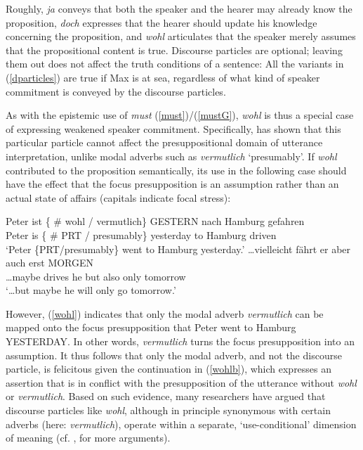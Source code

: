 \documentclass[11pt]{article}
\newcommand{\gcs}[1]{\textcolor{blue}{[gcs: #1]}}
\begin{document}
Roughly, \emph{ja} conveys that both the speaker and the hearer may already know the proposition, \emph{doch} expresses that the hearer should update his knowledge concerning the proposition, and \emph{wohl} articulates that the speaker merely assumes that the propositional content is true. Discourse particles are optional; leaving them out does not affect the truth conditions of a sentence: All the variants in (\ref{dparticles}) are true if Max is at sea, regardless of what kind of speaker commitment is conveyed by the discourse particles.


As with the epistemic use of \emph{must} (\ref{must})/(\ref{mustG}), \emph{wohl} is thus a special case of expressing weakened speaker commitment. Specifically, \cite{Zimmermann2004, Zimmermann2008} has shown that this particular particle cannot affect the presuppositional domain of utterance interpretation, unlike modal adverbs such as \emph{vermutlich} `presumably'. If \emph{wohl} contributed to the proposition semantically, its use in the following case should have the effect that the focus presupposition is an assumption rather than an actual state of affairs (capitals indicate focal stress):

\begin{exe}
\ex \label{wohl}
\begin{xlist}
\ex \gll Peter	ist	\{ \#	wohl  /	vermutlich\}	GESTERN			nach	 Hamburg	 gefahren	\\
		Peter	is		\{ \#	PRT  /   presumably\}	yesterday 		to	 Hamburg	 driven	\\	
\glt `Peter \{PRT/presumably\} went to Hamburg yesterday.'
\ex \label{wohlb} \gll \ldots vielleicht fährt er aber	auch erst MORGEN\\
\ldots maybe drives he but also only tomorrow\\
\glt `\ldots but maybe he will only go tomorrow.' 
\end{xlist}
\end{exe}
	
	
However, (\ref{wohl}) indicates that only the modal adverb \emph{vermutlich} can be mapped onto the focus presupposition that Peter went to Hamburg YESTERDAY. In other words, \emph{vermutlich} turns the focus presupposition into an assumption. It thus follows that only the modal adverb, and not the discourse particle, is felicitous given the continuation in (\ref{wohlb}), which expresses an assertion that is in conflict with the presupposition of the utterance without \emph{wohl} or \emph{vermutlich}. Based on such evidence, many researchers have argued that discourse particles like \emph{wohl}, although in principle synonymous with certain adverbs (here: \emph{vermutlich}), operate within a separate, `use-conditional' dimension of meaning (cf. \citealp[][pp.~215--268]{Gutzmann2015}, for more arguments).
\end{document}
